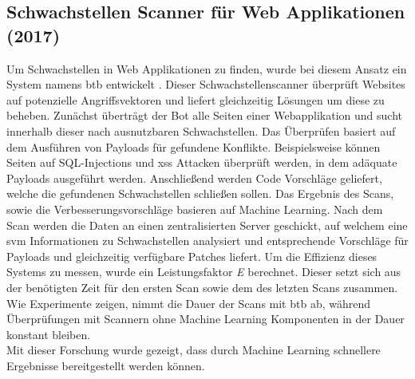 \documentclass[
    12pt, %
    DIV10,
    ngerman, %
    a4paper, %
    oneside, %
    titlepage, %
    parskip=half, %
    headings=normal, %
    listof=totoc, %
    bibliography=totoc, %
    index=totoc, %
    captions=tableheading, %
    final %
]{scrreprt}
\begin{document}
\subsection{Schwachstellen Scanner für Web Applikationen (2017)}
Um Schwachstellen in Web Applikationen zu finden, wurde bei diesem Ansatz ein System namens \ac{btb} entwickelt \parencite{VidyavardhakaCollegeofEngineering2017}. Dieser Schwachstellenscanner überprüft Websites auf potenzielle Angriffsvektoren und liefert gleichzeitig Lösungen um diese zu beheben. Zunächst überträgt der Bot alle Seiten einer Webapplikation und sucht innerhalb dieser nach ausnutzbaren Schwachstellen. Das Überprüfen basiert auf dem Ausführen von Payloads für gefundene Konflikte. Beispielsweise können Seiten auf SQL-Injections und \ac{xss} Attacken überprüft werden, in dem adäquate Payloads ausgeführt werden. Anschlie{\ss}end werden Code Vorschläge geliefert, welche die gefundenen Schwachstellen schlie{\ss}en sollen. Das Ergebnis des Scans, sowie die Verbesserungsvorschläge basieren auf Machine Learning. Nach dem Scan werden die Daten an einen zentralisierten Server geschickt, auf welchem eine \ac{svm} Informationen zu Schwachstellen analysiert und entsprechende Vorschläge für Payloads und gleichzeitig verfügbare Patches liefert. Um die Effizienz dieses Systems zu messen, wurde ein Leistungsfaktor \emph{E} berechnet. Dieser setzt sich aus der benötigten Zeit für den ersten Scan sowie dem des letzten Scans zusammen. Wie Experimente zeigen, nimmt die Dauer der Scans mit \ac{btb} ab, während Überprüfungen mit Scannern ohne Machine Learning Komponenten in der Dauer konstant bleiben.\\
Mit dieser Forschung wurde gezeigt, dass durch Machine Learning schnellere Ergebnisse bereitgestellt werden können.
%
\end{document}
